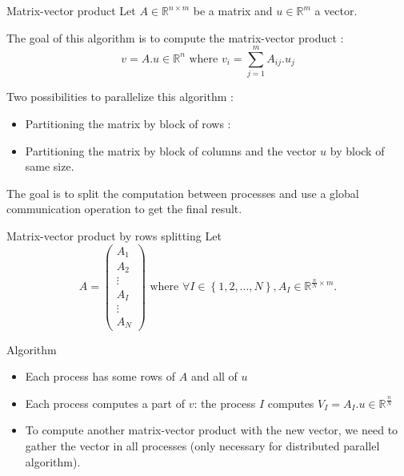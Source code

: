 \documentclass[compress,10pt,aspectratio=169]{beamer}
\begin{document}
\begin{frame}[fragile]{Matrix-vector product}
  \scriptsize
  Let $A\in\mathbb{R}^{n\times m}$ be a matrix and $u\in\mathbb{R}^{m}$ a vector.

  The goal of this algorithm is to compute the matrix-vector product :
  \[
  v = A.u\in\mathbb{R}^{n}\mbox{ where } v_{i} = \sum_{j=1}^{m} A_{ij}.u_{j}
  \]
  
  Two possibilities to parallelize this algorithm :
  \begin{itemize}
  \item Partitioning the matrix by block of rows :
  \item Partitioning the matrix by block of columns and the vector $u$ by block of same size.
  \end{itemize}

  The goal is to split the computation between processes and use a global communication operation
  to get the final result.

\end{frame}

\begin{frame}[fragile]{Matrix-vector product by rows splitting}
  \scriptsize
  Let
  \[
  A = \left(\begin{array}{c}
    A_{1} \\ \hline
    A_{2} \\ \hline
    \vdots \\ \hline
    A_{I} \\ \hline
    \vdots \\ \hline
    A_{N}
    \end{array}
  \right)
  \mbox{ where } \forall I\in\left\{1,2,\ldots,N\right\}, A_{I}\in\mathbb{R}^{\frac{n}{N}\times m}.
    \]

    \begin{exampleblock}{Algorithm}
      \begin{itemize}
      \item Each process has some rows of $A$ and all of $u$
      \item Each process computes a part of $v$: the process $I$ computes 
        $\displaystyle
        V_{I} = A_{I}.u \in \mathbb{R}^{\frac{n}{N}}
        $ 
      \item To compute another matrix-vector product with the new vector, we need to gather the vector
            in all processes (only necessary for distributed parallel algorithm).
      \end{itemize}
    \end{exampleblock}
  
\end{frame}
\end{document}

